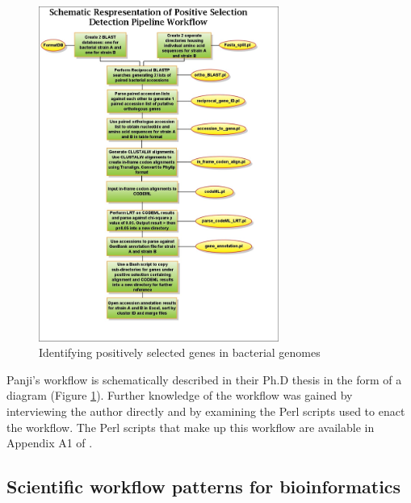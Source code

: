 \documentclass[a4paper,10pt]{scrreprt}
\begin{document}
\begin{figure}[!htb]
\centering
\includegraphics[width=0.7\textwidth]{sumir/Thesis_figures/Methods_section/pipeline_steps_mark_7}
\caption{Identifying positively selected genes in bacterial genomes}
\label{fig:sumir_pipeline}
\end{figure}

Panji's workflow is schematically described in their Ph.D thesis in the form of a diagram (Figure \ref{fig:sumir_pipeline}). Further knowledge of the workflow was gained by interviewing the author directly and by examining the Perl scripts used to enact the workflow.  The Perl scripts that make up this workflow are available in Appendix A1 of \cite{panji_identification_2009}.

\subsection{Scientific workflow patterns for bioinformatics}
\label{sec:workflow_patterns}
\end{document}

